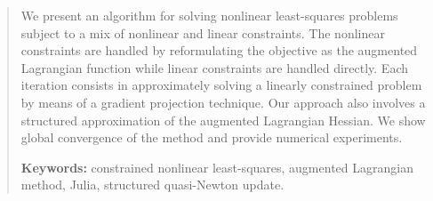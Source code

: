 \begin{abstract}
\noindent We present an algorithm for solving nonlinear least-squares problems subject to a mix of nonlinear and linear constraints. The nonlinear constraints are handled by reformulating the objective as the augmented Lagrangian function while linear constraints are handled directly. Each iteration consists in approximately solving a linearly constrained problem by means of a gradient projection technique. Our approach also involves a structured approximation of the augmented Lagrangian Hessian. We show global convergence of the method and provide numerical experiments.

\vspace{1em}\noindent\textbf{Keywords:} constrained nonlinear least-squares, augmented Lagrangian method, Julia, structured quasi-Newton update. 
\end{abstract} %